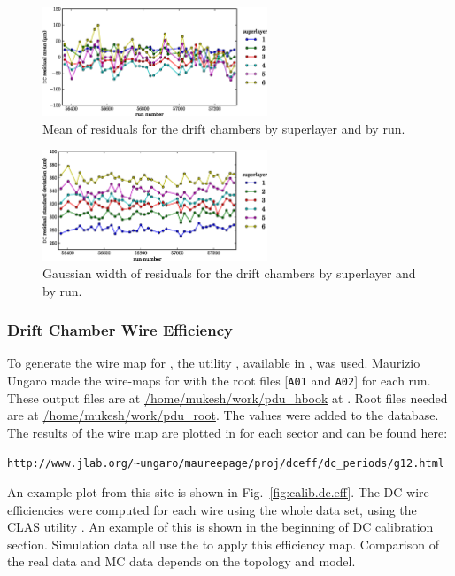 \begin{figure}\begin{center}
\includegraphics[width=0.6\textwidth]{figures/calib/dc/dc_resid_mean.eps}
\caption[DC Residuals (Mean)]{\label{fig:calib.dc.residuals.mean}Mean of residuals for the drift chambers by superlayer and by run.}
\end{center}\end{figure}

\begin{figure}\begin{center}
\includegraphics[width=0.6\textwidth]{figures/calib/dc/dc_resid_sigma.eps}
\caption[DC Residuals (Width)]{\label{fig:calib.dc.residuals.wid}Gaussian width of residuals for the drift chambers by superlayer and by run.}
\end{center}\end{figure}

\subsubsection{\label{sec:calib.dc.eff}Drift Chamber Wire Efficiency}

To generate the wire map for , the utility , available in , was used. Maurizio Ungaro made the wire-maps for  with the root files [\verb+A01+ and \verb+A02+] for each run. These output files are at \url{/home/mukesh/work/pdu_hbook} at . Root files needed are at \url{/home/mukesh/work/pdu_root}. The values were added to the  database. The results of the wire map are plotted in for each sector and can be found here:
\begin{verbatim}
http://www.jlab.org/~ungaro/maureepage/proj/dceff/dc_periods/g12.html
\end{verbatim}
\begin{v2}An example plot from this site is shown in Fig.~\ref{fig:calib.dc.eff}. The DC wire efficiencies were computed for each wire using the whole data set, using the CLAS utility . An example of this is shown in the beginning of DC calibration section. Simulation data all use the  to apply this efficiency map. Comparison of the real data and MC data depends on the topology and model.\end{v2}

